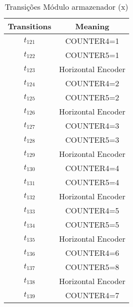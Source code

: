 \begin{table}[htbp]
\caption{Transições Módulo armazenador (x)}
\centering
\begin{tabular}{c|c}
Transitions & Meaning\\
\hline
\hyperlink{partialNet:t121}{\hypertarget{partialTable:t121}{$t_{121}$}} & COUNTER4=1\\
\hyperlink{partialNet:t122}{\hypertarget{partialTable:t122}{$t_{122}$}} & COUNTER5=1\\
\hyperlink{partialNet:t123}{\hypertarget{partialTable:t123}{$t_{123}$}} & Horizontal Encoder\\
\hyperlink{partialNet:t124}{\hypertarget{partialTable:t124}{$t_{124}$}} & COUNTER4=2\\
\hyperlink{partialNet:t125}{\hypertarget{partialTable:t125}{$t_{125}$}} & COUNTER5=2\\
\hyperlink{partialNet:t126}{\hypertarget{partialTable:t126}{$t_{126}$}} & Horizontal Encoder\\
\hyperlink{partialNet:t127}{\hypertarget{partialTable:t127}{$t_{127}$}} & COUNTER4=3\\
\hyperlink{partialNet:t128}{\hypertarget{partialTable:t128}{$t_{128}$}} & COUNTER5=3\\
\hyperlink{partialNet:t129}{\hypertarget{partialTable:t129}{$t_{129}$}} & Horizontal Encoder\\
\hyperlink{partialNet:t130}{\hypertarget{partialTable:t130}{$t_{130}$}} & COUNTER4=4\\
\hyperlink{partialNet:t131}{\hypertarget{partialTable:t131}{$t_{131}$}} & COUNTER5=4\\
\hyperlink{partialNet:t132}{\hypertarget{partialTable:t132}{$t_{132}$}} & Horizontal Encoder\\
\hyperlink{partialNet:t133}{\hypertarget{partialTable:t133}{$t_{133}$}} & COUNTER4=5\\
\hyperlink{partialNet:t134}{\hypertarget{partialTable:t134}{$t_{134}$}} & COUNTER5=5\\
\hyperlink{partialNet:t135}{\hypertarget{partialTable:t135}{$t_{135}$}} & Horizontal Encoder\\
\hyperlink{partialNet:t136}{\hypertarget{partialTable:t136}{$t_{136}$}} & COUNTER4=6\\
\hyperlink{partialNet:t137}{\hypertarget{partialTable:t137}{$t_{137}$}} & COUNTER5=8\\
\hyperlink{partialNet:t138}{\hypertarget{partialTable:t138}{$t_{138}$}} & Horizontal Encoder\\
\hyperlink{partialNet:t139}{\hypertarget{partialTable:t139}{$t_{139}$}} & COUNTER4=7\\

\end{tabular}
\end{table}
